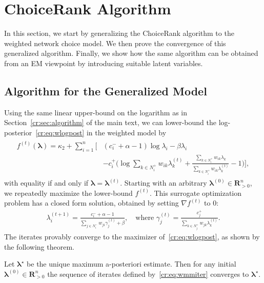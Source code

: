 \section{ChoiceRank Algorithm}  %
\label{cr:app:algorithm}

In this section, we start by generalizing the ChoiceRank algorithm to the weighted network choice model.
We then prove the convergence of this generalized algorithm.
Finally, we show how the same algorithm can be obtained from an EM viewpoint by introducing suitable latent variables.

\subsection{Algorithm for the Generalized Model}

Using the same linear upper-bound on the logarithm as in Section~\ref{cr:sec:algorithm} of the main text, we can lower-bound the log-posterior~\eqref{cr:eq:wlogpost} in the weighted model by
\begin{align}
\label{cr:eq:wminorizing}
\begin{aligned}
f^{(t)}(\bm{\lambda}) = \kappa_2 + \sum_{i = 1}^n \bigg[
    & (c^-_i + \alpha - 1) \log \lambda_i - \beta \lambda_i \\
    &- c^+_i \bigg( \log\!\sum_{k \in N^+_i}\!w_{ik} \lambda^{(t)}_k
                   +\frac{\sum_{k \in N^+_i}\!w_{ik} \lambda_k}{\sum_{k \in N^+_i}\!w_{ik} \lambda^{(t)}_k} -1 \bigg) \bigg],
\end{aligned}
\end{align}
with equality if and only if $\bm{\lambda} = \bm{\lambda}^{(t)}$.
Starting with an arbitrary $\bm{\lambda}^{(0)} \in \mathbf{R}^n_{>0}$, we repeatedly maximize the lower-bound $f^{(t)}$.
This surrogate optimization problem has a closed form solution, obtained by setting $\nabla f^{(t)}$ to $0$:
\begin{align}
\label{cr:eq:wmmiter}
\lambda_i^{(t + 1)} = \frac{c^-_i + \alpha - 1}{\sum_{j \in N^-_i} w_{ji} \gamma_j^{(t)} + \beta},
    \quad \text{where }
    \gamma_j^{(t)} = \frac{c^+_j}{\sum_{k \in N^+_j} w_{jk} \lambda_k^{(t)}}.
\end{align}
The iterates provably converge to the maximizer of~\eqref{cr:eq:wlogpost}, as shown by the following theorem.

\begin{theorem}
\label{cr:thm:wmmconv}
Let $\bm{\lambda}^\star$ be the unique maximum a-posteriori estimate.
Then for any initial $\bm{\lambda}^{(0)} \in \mathbf{R}^n_{> 0}$ the sequence of iterates defined by~\eqref{cr:eq:wmmiter} converges to $\bm{\lambda}^\star$.
\end{theorem}

